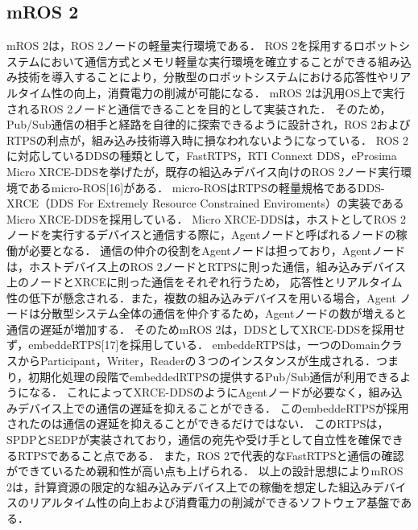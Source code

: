 \subsection{mROS 2}
mROS 2は，ROS 2ノードの軽量実行環境である．
ROS 2を採用するロボットシステムにおいて通信方式とメモリ軽量な実行環境を確立することができる組み込み技術を導入することにより，分散型のロボットシステムにおける応答性やリアルタイム性の向上，消費電力の削減が可能になる．
mROS 2は汎用OS上で実行されるROS 2ノードと通信できることを目的として実装された．
そのため，Pub/Sub通信の相手と経路を自律的に探索できるように設計され，ROS 2およびRTPSの利点が，組み込み技術導入時に損なわれないようになっている．
ROS 2に対応しているDDSの種類として，FastRTPS，RTI Connext DDS，eProsima Micro XRCE-DDSを挙げたが，既存の組込みデバイス向けのROS 2ノード実行環境であるmicro-ROS[16]がある．
micro-ROSはRTPSの軽量規格であるDDS-XRCE（DDS For Extremely Resource Constrained Enviroments）の実装であるMicro XRCE-DDSを採用している．
Micro XRCE-DDSは，ホストとしてROS 2ノードを実行するデバイスと通信する際に，Agentノードと呼ばれるノードの稼働が必要となる．
通信の仲介の役割をAgentノードは担っており，Agentノードは，ホストデバイス上のROS 2ノードとRTPSに則った通信，組み込みデバイス上のノードとXRCEに則った通信をそれぞれ行うため，
応答性とリアルタイム性の低下が懸念される．また，複数の組み込みデバイスを用いる場合，Agent ノードは分散型システム全体の通信を仲介するため，Agentノードの数が増えると通信の遅延が増加する．
そのためmROS 2は，DDSとしてXRCE-DDSを採用せず，embeddeRTPS[17]を採用している．
embeddeRTPSは，一つのDomainクラスからParticipant，Writer，Readerの３つのインスタンスが生成される．つまり，初期化処理の段階でembeddedRTPSの提供するPub/Sub通信が利用できるようになる．
これによってXRCE-DDSのようにAgentノードが必要なく，組み込みデバイス上での通信の遅延を抑えることができる．
このembeddeRTPSが採用されたのは通信の遅延を抑えることができるだけではない．
このRTPSは，SPDPとSEDPが実装されており，通信の宛先や受け手として自立性を確保できるRTPSであること点である．
また，ROS 2で代表的なFastRTPSと通信の確認ができているため親和性が高い点も上げられる．
以上の設計思想によりmROS 2は，計算資源の限定的な組み込みデバイス上での稼働を想定した組込みデバイスのリアルタイム性の向上および消費電力の削減ができるソフトウェア基盤である．
